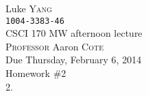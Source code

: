 \documentclass[UTF8,12pt,letterpaper,oneside]{amsart}
\begin{document}
\noindent Luke \textsc{Yang}\\
\texttt{1004-3383-46}\\
CSCI 170 MW afternoon lecture\\
\textsc{Professor} Aaron \textsc{Cote}\\
Due Thursday, February 6, 2014\\
Homework \#2\\

2. 
\end{document}
